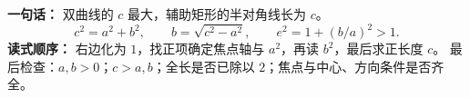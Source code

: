 \begin{summarybox}
\textbf{一句话：} 双曲线的 $c$ 最大，辅助矩形的半对角线长为 $c$。
\[
 c^2=a^2+b^2,\qquad b=\sqrt{c^2-a^2},\qquad
 e^2=1+(b/a)^2>1.
\]
\textbf{读式顺序：} 右边化为 $1$，找正项确定焦点轴与 $a^2$，再读 $b^2$，最后求正长度 $c$。
最后检查：$a,b>0$；$c>a,b$；全长是否已除以 $2$；焦点与中心、方向条件是否齐全。
\end{summarybox}
